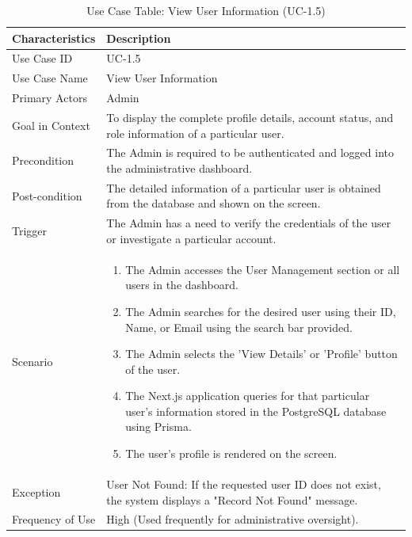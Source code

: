 \begin{table}[H]
    \centering
    \small
    \renewcommand{\arraystretch}{1.5}
    \caption{Use Case Table: View User Information (UC-1.5)} %
    \label{tab:use_case_view_user_info}
    \begin{tabularx}{\textwidth}{|l|X|}
        \hline
        \rowcolor[gray]{0.9} {Characteristics} & {Description} \\ \hline
        Use Case ID & UC-1.5 \\ \hline
        Use Case Name & View User Information \\ \hline
        Primary Actors & Admin \\ \hline
        Goal in Context & To display the complete profile details, account status, and role information of a particular user. \\ \hline
        Precondition & The Admin is required to be authenticated and logged into the administrative dashboard. \\ \hline
        Post-condition & The detailed information of a particular user is obtained from the database and shown on the screen. \\ \hline
        Trigger & The Admin has a need to verify the credentials of the user or investigate a particular account. \\ \hline
        Scenario & 
        \begin{enumerate}[nosep, leftmargin=*]
            \item The Admin accesses the User Management section or all users in the dashboard.
            \item The Admin searches for the desired user using their ID, Name, or Email using the search bar provided.
            \item The Admin selects the 'View Details' or 'Profile' button of the user.
            \item The Next.js application queries for that particular user’s information stored in the PostgreSQL database using Prisma.
            \item The user’s profile is rendered on the screen.
        \end{enumerate} \\ \hline
        Exception & {User Not Found:} If the requested user ID does not exist, the system displays a "Record Not Found" message. \\ \hline
        Frequency of Use & High (Used frequently for administrative oversight). \\ \hline
    \end{tabularx}
\end{table}
\FloatBarrier